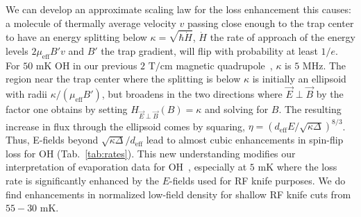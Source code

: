 \documentclass[%
 reprint,
 amsmath,amssymb,
 aps,
prl,
]{revtex4-1}
\newcommand{\epb}{{$\vec{E}\!\perp\!\vec{B}$}}
\newcommand{\epbm}{{\vec{E}\!\perp\!\vec{B}}}
\begin{document}
We can develop an approximate scaling law for the loss enhancement this causes: a molecule of thermally average velocity $v$ passing close enough to the trap center to have an energy splitting below $\kappa=\sqrt{\hbar \dot{H}}$, $\dot{H}$ the rate of approach of the energy levels $2\mu_\text{eff}B'v$ and $B'$ the trap gradient, will flip with probability at least $1/e$. For $50\text{ mK}$ OH in our previous $2\text{ T/cm}$ magnetic quadrupole~\cite{Sawyer2008},  $\kappa$ is $5\text{ MHz}$. The region near the trap center where the splitting is below $\kappa$ is initially an ellipsoid with radii $\kappa/(\mu_\text{eff}B')$, but broadens in the two directions where \epb{} by the factor one obtains by setting $H_\epbm(B)=\kappa$ and solving for $B$. The resulting increase in flux through the ellipsoid comes by squaring, $\eta = (d_\text{eff}E/\sqrt{\kappa\Delta})^{8/3}$. Thus, E-fields beyond $\sqrt{\kappa\Delta}/d_\text{eff}$ lead to almost cubic enhancements in spin-flip loss for OH (Tab.~\ref{tab:rates}). This new understanding modifies our interpretation of evaporation data for OH~\cite{Stuhl2012evap}, especially at $5\text{ mK}$ where the loss rate is significantly enhanced by the $E$-fields used for RF knife purposes. We do find enhancements in normalized low-field density for shallow RF knife cuts from $55-30\text{ mK}$.

\end{document}
